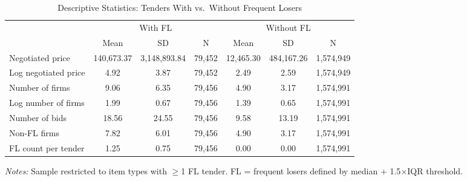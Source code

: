 \begin{table}[htbp]
\centering
\caption{Descriptive Statistics: Tenders With vs.\ Without Frequent Losers}
\label{tab:descstats}
\begin{adjustbox}{max width=\textwidth}
\begin{threeparttable}
\small
\begin{tabular}{lcccccc}
\toprule
 & \multicolumn{3}{c}{With FL} & \multicolumn{3}{c}{Without FL} \\
\cmidrule(lr){2-4} \cmidrule(lr){5-7}
 & Mean & SD & N & Mean & SD & N \\
\midrule
Negotiated price & 140,673.37 & 3,148,893.84 & 79,452 & 12,465.30 & 484,167.26 & 1,574,949 \\
Log negotiated price & 4.92 & 3.87 & 79,452 & 2.49 & 2.59 & 1,574,949 \\
Number of firms & 9.06 & 6.35 & 79,456 & 4.90 & 3.17 & 1,574,991 \\
Log number of firms & 1.99 & 0.67 & 79,456 & 1.39 & 0.65 & 1,574,991 \\
Number of bids & 18.56 & 24.55 & 79,456 & 9.58 & 13.19 & 1,574,991 \\
Non-FL firms & 7.82 & 6.01 & 79,456 & 4.90 & 3.17 & 1,574,991 \\
FL count per tender & 1.25 & 0.75 & 79,456 & 0.00 & 0.00 & 1,574,991 \\
\bottomrule
\end{tabular}
\begin{tablenotes}
\small
\item \textit{Notes:} Sample restricted to item types with $\geq$1 FL tender.
FL = frequent losers defined by median + 1.5$\times$IQR threshold.
\end{tablenotes}
\end{threeparttable}
\end{adjustbox}
\end{table}
